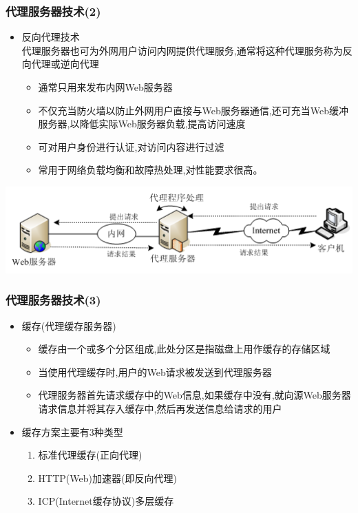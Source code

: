 \documentclass[xcolor=svgnames,presentation]{beamer}
\begin{document}
\begin{frame}
\frametitle{代理服务器技术(2)}
\label{sec-1-12}
\begin{itemize}

\item 反向代理技术\\
\label{sec-1-12-1}%
代理服务器也可为外网用户访问内网提供代理服务,通常将这种代理服务称为反向代理或逆向代理
\begin{itemize}

\item 通常只用来发布内网Web服务器
\label{sec-1-12-1-1}%

\item 不仅充当防火墙以防止外网用户直接与Web服务器通信,还可充当Web缓冲服务器,以降低实际Web服务器负载,提高访问速度
\label{sec-1-12-1-2}%

\item 可对用户身份进行认证,对访问内容进行过滤
\label{sec-1-12-1-3}%

\item 常用于网络负载均衡和故障热处理,对性能要求很高。
\label{sec-1-12-1-4}%
\end{itemize} %
\end{itemize} %
\label{sec-1-12-2}

\includegraphics[width=.9\linewidth]{img/agent2.png}
\end{frame}
\begin{frame}
\frametitle{代理服务器技术(3)}
\label{sec-1-13}
\begin{itemize}

\item 缓存(代理缓存服务器)
\label{sec-1-13-1}%
\begin{itemize}

\item 缓存由一个或多个分区组成,此处分区是指磁盘上用作缓存的存储区域
\label{sec-1-13-1-1}%

\item 当使用代理缓存时,用户的Web请求被发送到代理服务器
\label{sec-1-13-1-2}%

\item 代理服务器首先请求缓存中的Web信息,如果缓存中没有,就向源Web服务器请求信息并将其存入缓存中,然后再发送信息给请求的用户
\label{sec-1-13-1-3}%
\end{itemize} %

\item 缓存方案主要有3种类型
\label{sec-1-13-2}%
\begin{enumerate}
\item 标准代理缓存(正向代理)
\item HTTP(Web)加速器(即反向代理)
\item ICP(Internet缓存协议)多层缓存
\end{enumerate}
\end{itemize} %
\end{frame}
\end{document}
